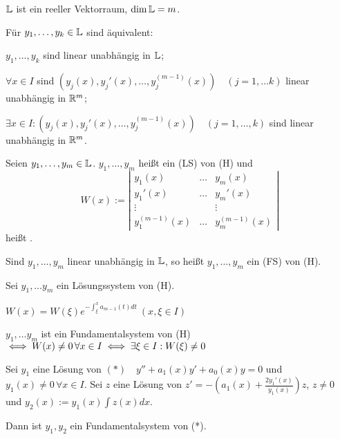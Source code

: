 \documentclass{article}
\begin{document}
\begin{satz} %
\begin{liste}
\item $\mathbb{L}$ ist ein reeller Vektorraum, $\dim \mathbb{L} = m$.
\item Für $y_1, \ldots, y_k \in \mathbb{L}$ sind äquivalent:
\begin{liste}
\item $y_1, \ldots, y_k$ sind linear unabhängig in $\mathbb{L}$;
\item $\forall x \in I$ sind $(y_j(x), y_j'(x), \ldots, y_j^{(m-1)}(x))\quad (j=1,\ldots k)$ linear unabhängig in $\mathbb{R}^m$;
\item $\exists x \in I:(y_j(x), y_j'(x), \ldots, y_j^{(m-1)}(x))\quad (j=1,\ldots, k)$ sind linear unabhängig in $\mathbb{R}^m$.
\end{liste}
\end{liste}
\end{satz}

\begin{definition} 
Seien $y_1, \ldots, y_m \in \mathbb{L}$. $y_1, \ldots, y_m$ heißt ein
 (LS) von (H) und
\[W(x) := \left|\begin{array}{ccc}
y_1(x) & \ldots & y_m(x)\\y_1'(x) & \ldots & y_m'(x)\\ \vdots & & \vdots\\
y_1^{(m-1)}(x) & \ldots & y_m^{(m-1)}(x)\end{array}\right|\] heißt
.

Sind $y_1, \ldots, y_m$ linear unabhängig in $\mathbb{L}$, so heißt $y_1, \ldots, y_m$ ein  (FS) von (H).
\end{definition}

\begin{satz} %
Sei $y_1, \ldots y_m$ ein Lösungssystem von (H).
\begin{liste} 
\item $W(x) = W(\xi)e^{-\int_{\xi}^{x}a_{m-1}(t)dt} \  (x, \xi \in I)$
\item $y_1, \ldots y_m$ ist ein Fundamentalsystem von (H) $\iff W(x) \neq 0 \, \forall x \in I \iff \exists \xi \in I: W(\xi) \neq 0$
\end{liste}
\end{satz}

\begin{satz}[Reduktionsverfahren von d'Alembert ($m=2$)]
Sei $y_1$ eine Lösung von $(*)\quad y''+a_1(x)y'+a_0(x)y=0$ und $y_1(x) \neq 0 \, \forall x \in I$. Sei $z$ eine Lösung von $z'=-(a_1(x) + \frac{2y_1'(x)}{y_1(x)})z$, $z \neq 0$ und $y_2(x):=y_1(x)\int z(x)dx$.

Dann ist $y_1, y_2$ ein Fundamentalsystem von (*).
\end{satz}
\end{document}
